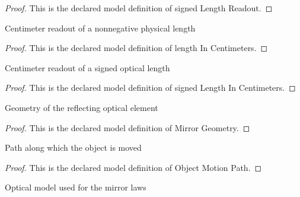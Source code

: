\begin{proof}
  This is the declared model definition of signed Length Readout.
\end{proof}
\begin{definition}
  \label{def:physics:phyx-mini-0478:phyxminiproblems-problemphyxmini0478-lengthincentimeters}
  Centimeter readout of a nonnegative physical length
\end{definition}
\begin{proof}
  This is the declared model definition of length In Centimeters.
\end{proof}
\begin{definition}
  \label{def:physics:phyx-mini-0478:phyxminiproblems-problemphyxmini0478-signedlengthincentimeters}
  Centimeter readout of a signed optical length
\end{definition}
\begin{proof}
  This is the declared model definition of signed Length In Centimeters.
\end{proof}
\begin{definition}
  \label{def:physics:phyx-mini-0478:phyxminiproblems-problemphyxmini0478-mirrorgeometry}
  Geometry of the reflecting optical element
\end{definition}
\begin{proof}
  This is the declared model definition of Mirror Geometry.
\end{proof}
\begin{definition}
  \label{def:physics:phyx-mini-0478:phyxminiproblems-problemphyxmini0478-objectmotionpath}
  Path along which the object is moved
\end{definition}
\begin{proof}
  This is the declared model definition of Object Motion Path.
\end{proof}
\begin{definition}
  \label{def:physics:phyx-mini-0478:phyxminiproblems-problemphyxmini0478-opticalapproximation}
  Optical model used for the mirror laws
\end{definition}
